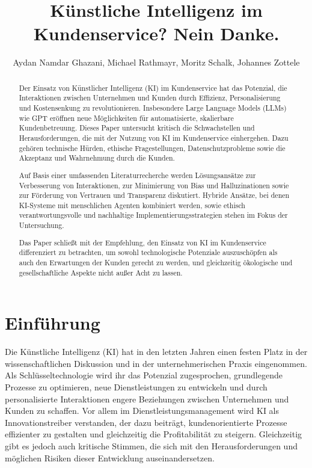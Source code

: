\documentclass[12pt]{article}
\title{Künstliche Intelligenz im Kundenservice? Nein Danke.}
\author{Aydan Namdar Ghazani, Michael Rathmayr, Moritz Schalk, Johannes Zottele}
\begin{document}
\maketitle

\begin{abstract}
Der Einsatz von Künstlicher Intelligenz (KI) im Kundenservice hat das Potenzial, die Interaktionen zwischen Unternehmen und Kunden durch Effizienz, Personalisierung und Kostensenkung zu revolutionieren. Insbesondere Large Language Models (LLMs) wie GPT eröffnen neue Möglichkeiten für automatisierte, skalierbare Kundenbetreuung. Dieses Paper untersucht kritisch die Schwachstellen und Herausforderungen, die mit der Nutzung von KI im Kundenservice einhergehen. Dazu gehören technische Hürden, ethische Fragestellungen, Datenschutzprobleme sowie die Akzeptanz und Wahrnehmung durch die Kunden.

Auf Basis einer umfassenden Literaturrecherche werden Lösungsansätze zur Verbesserung von Interaktionen, zur Minimierung von Bias und Halluzinationen sowie zur Förderung von Vertrauen und Transparenz diskutiert. Hybride Ansätze, bei denen KI-Systeme mit menschlichen Agenten kombiniert werden, sowie ethisch verantwortungsvolle und nachhaltige Implementierungsstrategien stehen im Fokus der Untersuchung.

Das Paper schließt mit der Empfehlung, den Einsatz von KI im Kundenservice differenziert zu betrachten, um sowohl technologische Potenziale auszuschöpfen als auch den Erwartungen der Kunden gerecht zu werden, und gleichzeitig ökologische und gesellschaftliche Aspekte nicht außer Acht zu lassen.
\end{abstract}



\section{Einführung}

Die Künstliche Intelligenz (KI) hat in den letzten Jahren einen festen Platz in der wissenschaftlichen Diskussion und in der unternehmerischen Praxis eingenommen.
Als Schlüsseltechnologie wird ihr das Potenzial zugesprochen, grundlegende Prozesse zu optimieren, neue Dienstleistungen zu entwickeln und durch personalisierte Interaktionen engere Beziehungen zwischen Unternehmen und Kunden zu schaffen.
Vor allem im Dienstleistungsmanagement wird KI als Innovationstreiber verstanden, der dazu beiträgt, kundenorientierte Prozesse effizienter zu gestalten und gleichzeitig die Profitabilität zu steigern.
Gleichzeitig gibt es jedoch auch kritische Stimmen, die sich mit den Herausforderungen und möglichen Risiken dieser Entwicklung auseinandersetzen.
\end{document}
